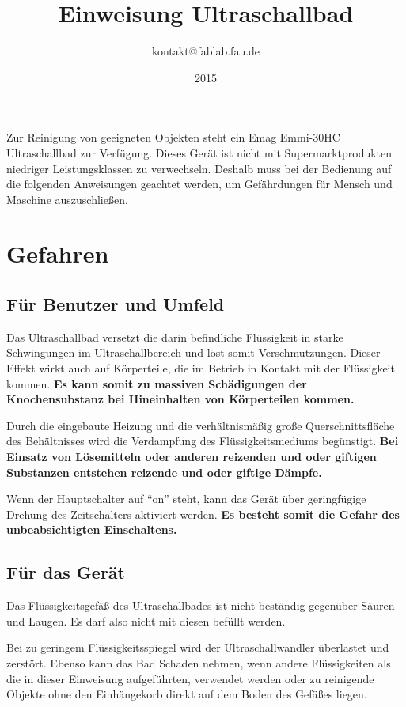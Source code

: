 \documentclass{\basedir/fablab-document}
\date{2015}
\author{kontakt@fablab.fau.de}
\title{Einweisung Ultraschallbad}
\begin{document}
	\maketitle
	
Zur Reinigung von geeigneten Objekten steht ein Emag Emmi-30HC Ultraschallbad zur Verfügung.
Dieses Gerät ist nicht mit Supermarktprodukten niedriger Leistungsklassen zu verwechseln.
Deshalb muss bei der Bedienung auf die folgenden Anweisungen geachtet werden, um Gefährdungen für Mensch und Maschine auszuschließen.
	
\section{Gefahren}
\subsection{Für Benutzer und Umfeld}
Das Ultraschallbad versetzt die darin befindliche Flüssigkeit in starke Schwingungen im Ultraschallbereich und löst somit Verschmutzungen.
Dieser Effekt wirkt auch auf Körperteile, die im Betrieb in Kontakt mit der Flüssigkeit kommen.
\textbf{Es kann somit zu massiven Schädigungen der Knochensubstanz bei Hineinhalten von Körperteilen kommen.}

Durch die eingebaute Heizung und die verhältnismäßig große Querschnittsfläche des Behältnisses wird die Verdampfung des Flüssigkeitsmediums begünstigt.
\textbf{Bei Einsatz von Lösemitteln oder anderen reizenden und oder giftigen Substanzen entstehen reizende und oder giftige Dämpfe.}

Wenn der Hauptschalter auf \enquote{on} steht, kann das Gerät über geringfügige Drehung des Zeitschalters aktiviert werden.
\textbf{Es besteht somit die Gefahr des unbeabsichtigten Einschaltens.}

\subsection{Für das Gerät}
Das Flüssigkeitsgefäß des Ultraschallbades ist nicht beständig gegenüber Säuren und Laugen.
Es darf also nicht mit diesen befüllt werden.

Bei zu geringem Flüssigkeitsspiegel wird der Ultraschallwandler überlastet und zerstört.
Ebenso kann das Bad Schaden nehmen, wenn andere Flüssigkeiten als die in dieser Einweisung aufgeführten,
verwendet werden oder zu reinigende Objekte ohne den Einhängekorb direkt auf dem Boden des Gefäßes liegen.
\end{document}
